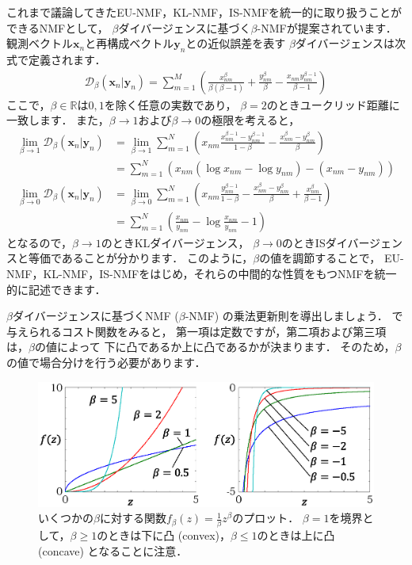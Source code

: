 これまで議論してきたEU-NMF，KL-NMF，IS-NMFを統一的に取り扱うことができるNMFとして，
$\beta$ダイバージェンスに基づく$\beta$-NMFが提案されています\cite{nakano:mlsp:2010}．
観測ベクトル$\bm{x}_n$と再構成ベクトル$\bm{y}_n$との近似誤差を表す
$\beta$ダイバージェンスは次式で定義されます．
\begin{align}
\mathcal{D}_\beta(\bm{x}_n | \bm{y}_n) 
=
\sum_{m=1}^M \left(
\frac{x_{nm}^\beta}{\beta(\beta - 1)} 
+ \frac{y_{nm}^\beta}{\beta} 
- \frac{x_{nm} y_{nm}^{\beta - 1}}{\beta - 1}
\right)
\label{eqn:beta_div}
\end{align}
ここで，$\beta \in \mathbb{R}$は$0,1$を除く任意の実数であり，
$\beta=2$のときユークリッド距離に一致します．
また，$\beta \rightarrow 1$および$\beta \rightarrow 0$の極限を考えると，
\begin{align}
\lim_{\beta \rightarrow 1} \mathcal{D}_\beta(\bm{x}_n | \bm{y}_n)
&= 
\lim_{\beta \rightarrow 1}
\sum_{m = 1}^N 
\left(x_{nm} \frac{x_{nm}^{\beta - 1} - y_{nm}^{\beta - 1}}{1 - \beta} 
      - \frac{x_{nm}^\beta - y_{nm}^\beta}{\beta}\right)
\nonumber\\
&= 
\sum_{m = 1}^N
\left(
x_{nm}(\log x_{nm} - \log y_{nm}) - (x_{nm} - y_{nm})
\right)
\\
\lim_{\beta \rightarrow 0} \mathcal{D}_\beta(\bm{x}_n | \bm{y}_n)
&= 
\lim_{\beta \rightarrow 0}
\sum_{m = 1}^N 
\left(x_{nm} \frac{y_{nm}^{\beta - 1}}{1 - \beta} - \frac{x_{nm}^\beta - y_{nm}^\beta}{\beta}
      + \frac{x_{nm}^\beta}{\beta - 1}\right)
\nonumber\\
&= 
\sum_{m = 1}^N
\left(
\frac{x_{nm}}{y_{nm}} - \log \frac{x_{nm}}{y_{nm}} - 1
\right)
\end{align}
となるので，$\beta \rightarrow 1$のときKLダイバージェンス，
$\beta \rightarrow 0$のときISダイバージェンスと等価であることが分かります．
このように，$\beta$の値を調節することで，
EU-NMF，KL-NMF，IS-NMFをはじめ，それらの中間的な性質をもつNMFを統一的に記述できます．

$\beta$ダイバージェンスに基づくNMF ($\beta$-NMF) の乗法更新則を導出しましょう．
で与えられるコスト関数をみると，
第一項は定数ですが，第二項および第三項は，$\beta$の値によって
下に凸であるか上に凸であるかが決まります．
そのため，$\beta$の値で場合分けを行う必要があります．

\begin{figure}[t]
\centering
\includegraphics[width=.99\linewidth]{sections/factorization/beta_div_aux_functions}
\caption{いくつかの$\beta$に対する関数$f_\beta(z)=\frac{1}{\beta} z^\beta$のプロット．
$\beta=1$を境界として，$\beta \ge 1$のときは下に凸 (convex)，$\beta \le 1$のときは上に凸 (concave) となることに注意．}
\label{fig:beta_div_aux_functions}
\end{figure}

